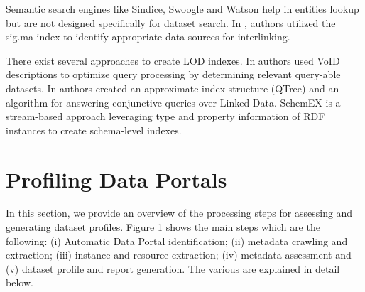 \documentclass[runningheads,a4paper]{llncs}
\begin{document}
Semantic search engines like Sindice\cite{Delbru2010a}, Swoogle\cite{Ding2004} and Watson\cite{d'Aquin:2011:WMS:2019470.2019476} help in entities lookup but are not designed specifically for dataset search. In \cite{whatShouldILinkTo}, authors utilized the sig.ma index\cite{Tummarello10sig.ma:live} to identify appropriate data sources for interlinking.

There exist several approaches to create LOD indexes. In \cite{Alexander:LDOW09} authors used VoID descriptions to optimize query processing by determining relevant query-able datasets. In \cite{Harth:2010:DSO:1772690.1772733} authors created an approximate index structure (QTree) and an algorithm for answering conjunctive queries over Linked Data. SchemEX\cite{Konrath:2012:SEC:2399444.2399563} is a stream-based approach leveraging type and property information of RDF instances to create schema-level indexes.


\section{Profiling Data Portals}
\label{sec:profiling data portals}

In this section, we provide an overview of the processing steps for assessing and generating dataset profiles. Figure 1 shows the main steps which are the following: (i) Automatic Data Portal identification; (ii) metadata crawling and extraction; (iii) instance and resource extraction; (iv) metadata assessment and (v) dataset profile and report generation. The various are explained in detail below.


\nocite{*}

\end{document}

